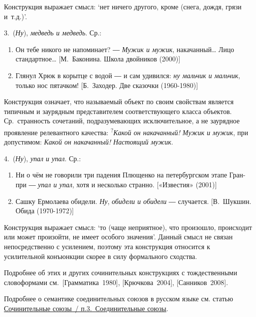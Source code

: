 Конструкция выражает смысл: `нет ничего другого, кроме (снега, дождя,
грязи и~т.д.)'.

3.~(\textit{Ну}), \textit{медведь и медведь}. Ср.:

\begin{enumerate}
  \def\labelenumi{(\arabic{enumi})}
  \setcounter{enumi}{166}
  \item
        Он тебе никого не напоминает? ― \textit{Мужик и мужик},
        накачанный\ldots{} Лицо стандартное\ldots{} {[}М.~Баконина. Школа
        двойников (2000){]}
  \item
        Глянул Хрюк в корытце с водой ― и сам удивился: \textit{ну мальчик и
          мальчик}, только нос пятачком! {[}Б.~Заходер. Две сказочки
        (1960-1980){]}
\end{enumerate}

Конструкция означает, что называемый объект по своим свойствам является
типичным и заурядным представителем соответствующего класса объектов.
Ср.~странность сочетаний, подразумевающих исключительное, а не заурядное
проявление релевантного качества: \textsuperscript{?}\textit{Какой он
  накачанный! Мужик и мужик}, при допустимом: \textit{Какой он накачанный!
  Настоящий мужик}.

4.~(\textit{Ну}), \textit{упал и упал}. Ср.:

\begin{enumerate}
  \def\labelenumi{(\arabic{enumi})}
  \setcounter{enumi}{168}
  \item
        Ни о чём не говорили три падения Плющенко на петербургском этапе
        Гран-при ― \textit{упал и упал}, хотя и несколько странно. {[}«Известия»
        (2001){]}
  \item
        Сашку Ермолаева обидели. \textit{Ну}, \textit{обидели и обидели} ―
        случается. {[}В.~Шукшин. Обида (1970-1972){]}
\end{enumerate}

Конструкция выражает смысл: `то (чаще неприятное), что произошло,
происходит или может произойти, не имеет особого значения'. Данный смысл
не связан непосредственно с усилением, поэтому эта конструкция относится
к усилительной конъюнкции скорее в силу формального сходства.

Подробнее об этих и других сочинительных конструкциях с тождественными
словоформами см.~{[}Грамматика~1980{]}, {[}Крючкова~2004{]},
{[}Санников~2008{]}.

Подробнее о семантике соединительных союзов в русском языке см. статью
\underline{Сочинительные союзы~/ п.3.~Соединительные союзы}.


